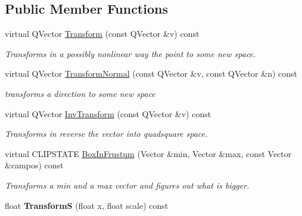 \subsection*{Public Member Functions}
\begin{DoxyCompactItemize}
\item 
virtual Q\+Vector \hyperlink{classIdentityTransform_a21de8ca99762c2321fa2c7b4ba8f09ef}{Transform} (const Q\+Vector \&v) const \hypertarget{classIdentityTransform_a21de8ca99762c2321fa2c7b4ba8f09ef}{}\label{classIdentityTransform_a21de8ca99762c2321fa2c7b4ba8f09ef}

\begin{DoxyCompactList}\small\item\em Transforms in a possibly nonlinear way the point to some new space. \end{DoxyCompactList}\item 
virtual Q\+Vector \hyperlink{classIdentityTransform_a3df83988de181c9be40799c29bf3fa62}{Transform\+Normal} (const Q\+Vector \&v, const Q\+Vector \&n) const \hypertarget{classIdentityTransform_a3df83988de181c9be40799c29bf3fa62}{}\label{classIdentityTransform_a3df83988de181c9be40799c29bf3fa62}

\begin{DoxyCompactList}\small\item\em transforms a direction to some new space \end{DoxyCompactList}\item 
virtual Q\+Vector \hyperlink{classIdentityTransform_a1d1a66296f878befe288eb4705d832fa}{Inv\+Transform} (const Q\+Vector \&v) const \hypertarget{classIdentityTransform_a1d1a66296f878befe288eb4705d832fa}{}\label{classIdentityTransform_a1d1a66296f878befe288eb4705d832fa}

\begin{DoxyCompactList}\small\item\em Transforms in reverse the vector into quadsquare space. \end{DoxyCompactList}\item 
virtual C\+L\+I\+P\+S\+T\+A\+TE \hyperlink{classIdentityTransform_a7f89e70a26e0b6d28450d4ce9eeaa47f}{Box\+In\+Frustum} (Vector \&min, Vector \&max, const Vector \&campos) const \hypertarget{classIdentityTransform_a7f89e70a26e0b6d28450d4ce9eeaa47f}{}\label{classIdentityTransform_a7f89e70a26e0b6d28450d4ce9eeaa47f}

\begin{DoxyCompactList}\small\item\em Transforms a min and a max vector and figures out what is bigger. \end{DoxyCompactList}\item 
float {\bfseries TransformS} (float x, float scale) const \hypertarget{classIdentityTransform_a3e6ee0010a1d649ea0faba077582fa55}{}\label{classIdentityTransform_a3e6ee0010a1d649ea0faba077582fa55}


\end{DoxyCompactItemize}
